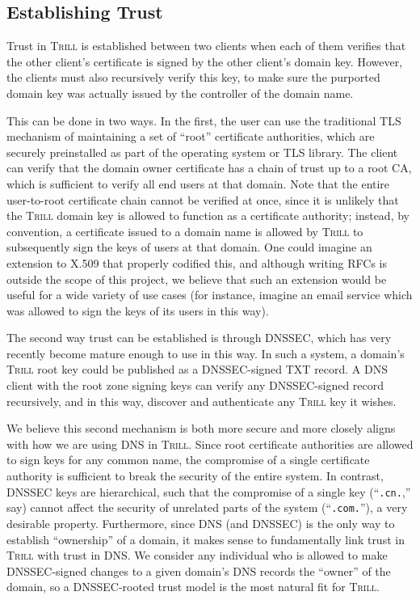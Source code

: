 \documentclass[11pt]{article}
\newcommand{\Trill}{\textsc{Trill}\xspace}
\begin{document}
\subsection{Establishing Trust}

Trust in \Trill is established between two clients when each of them verifies
that the other client's certificate is signed by the other client's domain key.
However, the clients must also recursively verify this key, to make sure the
purported domain key was actually issued by the controller of the domain name.

This can be done in two ways. In the first, the user can use the traditional TLS
mechanism of maintaining a set of ``root'' certificate authorities, which are
securely preinstalled as part of the operating system or TLS library. The client
can verify that the domain owner certificate has a chain of trust up to a root
CA, which is sufficient to verify all end users at that domain. Note that the
entire user-to-root certificate chain cannot be verified at once, since it is
unlikely that the \Trill domain key is allowed to function as a certificate
authority; instead, by convention, a certificate issued to a domain name is
allowed by \Trill to subsequently sign the keys of users at that domain. One
could imagine an extension to X.509 that properly codified this, and although
writing RFCs is outside the scope of this project, we believe that such an
extension would be useful for a wide variety of use cases (for instance, imagine
an email service which was allowed to sign the keys of its users in this way).

The second way trust can be established is through DNSSEC, which has very
recently become mature enough to use in this way. In such a system, a domain's
\Trill root key could be published as a DNSSEC-signed TXT record. A DNS client
with the root zone signing keys can verify any DNSSEC-signed record recursively,
and in this way, discover and authenticate any \Trill key it wishes.

We believe this second mechanism is both more secure and more closely aligns
with how we are using DNS in \Trill. Since root certificate authorities are
allowed to sign keys for any common name, the compromise of a single certificate
authority is sufficient to break the security of the entire system. In contrast,
DNSSEC keys are hierarchical, such that the compromise of a single key
(``\verb`.cn.`,'' say) cannot affect the security of unrelated parts of the system
(``\verb`.com.`''), a very desirable property. Furthermore, since DNS (and
DNSSEC) is the only way to establish ``ownership'' of a domain, it makes sense
to fundamentally link trust in \Trill with trust in DNS. We consider any
individual who is allowed to make DNSSEC-signed changes to a given domain's DNS
records the ``owner'' of the domain, so a DNSSEC-rooted trust model is the most
natural fit for \Trill.
\end{document}
